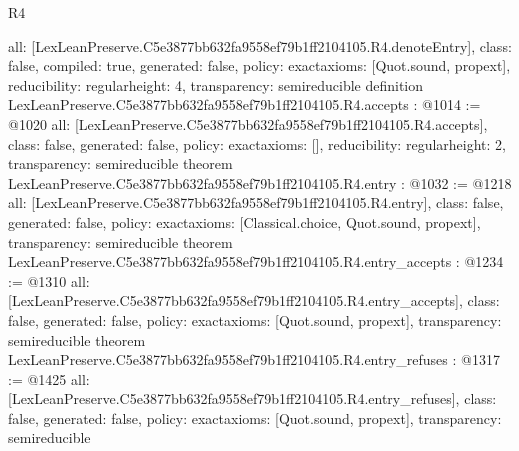 \begin{lexlean}{R4}
\begin{coremodule}
{  all: [LexLeanPreserve.C5e3877bb632fa9558ef79b1ff2104105.R4.denoteEntry],
  class: false,
  compiled: true,
  generated: false,
  policy: exact{axioms: [Quot.sound, propext]},
  reducibility: regular{height: 4},
  transparency: semireducible
}
definition LexLeanPreserve.C5e3877bb632fa9558ef79b1ff2104105.R4.accepts : @1014 := @1020 {
  all: [LexLeanPreserve.C5e3877bb632fa9558ef79b1ff2104105.R4.accepts],
  class: false,
  generated: false,
  policy: exact{axioms: []},
  reducibility: regular{height: 2},
  transparency: semireducible
}
theorem LexLeanPreserve.C5e3877bb632fa9558ef79b1ff2104105.R4.entry : @1032 := @1218 {
  all: [LexLeanPreserve.C5e3877bb632fa9558ef79b1ff2104105.R4.entry],
  class: false,
  generated: false,
  policy: exact{axioms: [Classical.choice, Quot.sound, propext]},
  transparency: semireducible
}
theorem LexLeanPreserve.C5e3877bb632fa9558ef79b1ff2104105.R4.entry_accepts : @1234 := @1310 {
  all: [LexLeanPreserve.C5e3877bb632fa9558ef79b1ff2104105.R4.entry_accepts],
  class: false,
  generated: false,
  policy: exact{axioms: [Quot.sound, propext]},
  transparency: semireducible
}
theorem LexLeanPreserve.C5e3877bb632fa9558ef79b1ff2104105.R4.entry_refuses : @1317 := @1425 {
  all: [LexLeanPreserve.C5e3877bb632fa9558ef79b1ff2104105.R4.entry_refuses],
  class: false,
  generated: false,
  policy: exact{axioms: [Quot.sound, propext]},
  transparency: semireducible
}


\end{coremodule}
\end{lexlean}
